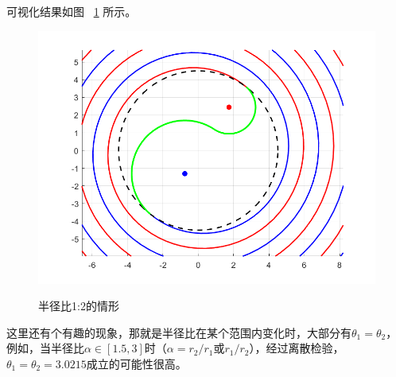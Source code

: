 \documentclass{cumcmthesis1}
\begin{document}
\par
可视化结果如图
~\ref{1:2} 
所示。
\begin{figure}
    \caption{半径比1:2的情形}
    \centering    
    \includegraphics[width=0.7\linewidth]{drawing_5.4.1.2.png}
    \label{1:2}
\end{figure}
\par
这里还有个有趣的现象，那就是半径比在某个范围内变化时，大部分有$\theta_1=\theta_2$，例如，当半径比$\alpha \in [1.5,3]$时（$\alpha=r_2  /r_1$或$r_1/r_2$），经过离散检验，
$\theta_1=\theta_2=3.0215$成立的可能性很高。
\end{document}
